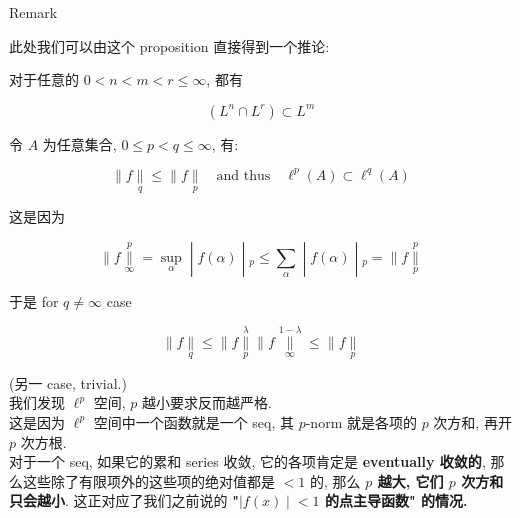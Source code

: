 \documentclass{qlnotes-export}
\begin{document}
\begin{qlremark}{Remark}

此处我们可以由这个 proposition 直接得到一个推论: ~

\begin{corollary}\label{cor-09-l-p-space-and-inequalities-corollary-002}

对于任意的 \(0 < n < m < r \leq \infty\), 都有

\[(L^{n} \cap L^{r}) \subset L^{m}\]

\end{corollary}

\end{qlremark}

\begin{example}\label{ex-09-l-p-space-and-inequalities-example-005}

令 \(A\) 为任意集合, \(0 \leq p < q \leq \infty\), 有:

\[\parallel f\underset{q}{\parallel} \leq \parallel f\underset{p}{\parallel}\quad\text{and thus}\quad\ell^{p}(A) \subset \ell^{q}(A)\]

这是因为

\[\left. \parallel f\underset{\infty}{\overset{p}{\parallel}} = \sup\limits_{\alpha} \middle| f(\alpha) \middle| {}_{p} \leq \sum\limits_{\alpha} \middle| f(\alpha) \middle| {}_{p} = \parallel f\underset{p}{\overset{p}{\parallel}} \right.\]

于是 for \(q \neq \infty\) case

\[\parallel f\underset{q}{\parallel} \leq \parallel f\underset{p}{\overset{\lambda}{\parallel}} \parallel f\underset{\infty}{\overset{1 - \lambda}{\parallel}} \leq \parallel f\underset{p}{\parallel}\]

(另一 case, trivial.)\\
我们发现 \(\ell^{p}\) 空间, \(p\) 越小要求反而越严格.\\
这是因为 \(\ell^{p}\) 空间中一个函数就是一个 seq, 其 \(p\)-norm 就是各项的 \(p\) 次方和, 再开 \(p\) 次方根.\\
对于一个 seq, 如果它的累和 series 收敛, 它的各项肯定是 \textbf{eventually 收敛的}, 那么这些除了有限项外的这些项的绝对值都是 \(< 1\) 的, 那么 \textbf{\(p\) 越大, 它们 \(p\) 次方和只会越小}. 这正对应了我们之前说的 \textbf{"\(\left. |f(x) \middle| < 1 \right.\) 的点主导函数" 的情况.}\\
\strut \\

\end{example}
\end{document}
